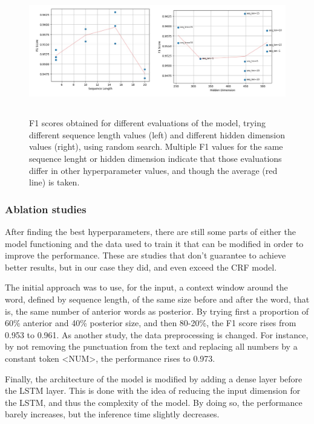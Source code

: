 \documentclass{article}
\begin{document}
\begin{figure}[!t]
	\centering
	\includegraphics[height=5.6cm]{images/lstm_analysis.jpg}
	\captionsetup{width=0.9\textwidth}
	\caption{F1 scores obtained for different evaluations of the model, trying different sequence length values (left)
	and different hidden dimension values (right), using random search. Multiple F1 values for the same sequence lenght
	or hidden dimension indicate that those evaluations differ in other hyperparameter values, and though the
	average (red line) is taken.}
	\label{fig:lstm_analysis}
\end{figure}

\subsubsection*{Ablation studies}
After finding the best hyperparameters, there are still some parts of either the model functioning and the data used
to train it that can be modified in order to improve the performance. These are studies that don’t guarantee to
achieve better results, but in our case they did, and even exceed the CRF model.

The initial approach was to use, for the input, a context window around the word, defined by sequence length,
of the same size before and after the word, that is, the same number of anterior words as posterior. By trying first
a proportion of 60\% anterior and 40\% posterior size, and then 80-20\%, the F1 score rises from 0.953 to 0.961.
As another study, the data preprocessing is changed. For instance, by not removing the punctuation from the text and
replacing all numbers by a constant token <NUM>, the performance rises to 0.973.

Finally, the architecture of the model is modified by adding a dense layer before the LSTM layer. This is done with
the idea of reducing the input dimension for the LSTM, and thus the complexity of the model. By doing so, the performance
barely increases, but the inference time slightly decreases.
\end{document}
